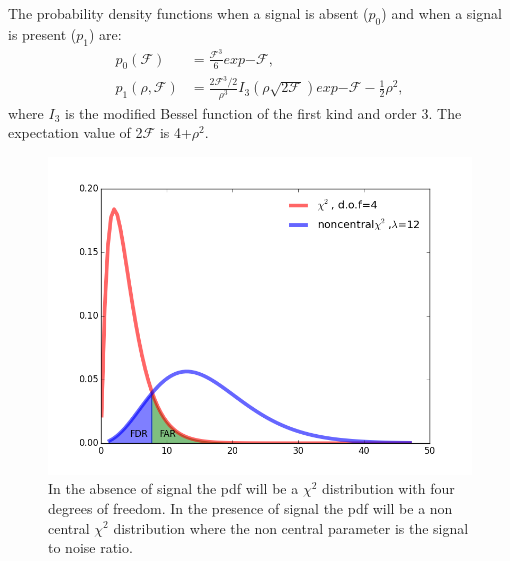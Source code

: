 \documentclass{ttuthes2007}
\begin{document}
The probability density functions when a signal is absent ($p_0$) and when a signal is present ($p_1$) are:
\begin{equation}
\begin{split}
p_0(\mathcal{F})&=\frac{\mathcal{F}^3}{6}exp{-\mathcal{F}},\\
p_1(\rho,\mathcal{F})&=\frac{2\mathcal{F}^3/2}{\rho^3}I_3(\rho\sqrt{2\mathcal{F}})exp{-\mathcal{F}-\frac{1}{2}\rho^2},
\end{split}
\end{equation}
where $I_3$ is the modified Bessel function of the first kind and order 3.
The expectation value of 2$\mathcal{F}$ is 4+$\rho^2$.
\begin{figure}[h!]
	\includegraphics[width=\textwidth]{figure/chi2.png}
	\caption{In the absence of signal the pdf will be a $\chi^2$ distribution with
four degrees of freedom. In the presence of signal the pdf will be a non central
$\chi^2$ distribution where the non central parameter is the signal to noise
ratio.}
\end{figure}
\end{document}
